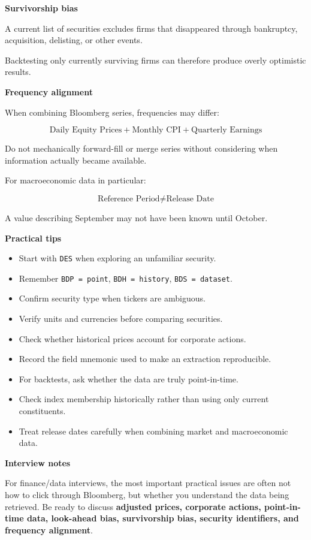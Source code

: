 \documentclass[11pt,letterpaper]{article}
\begin{document}
\textbf{Survivorship bias}

A current list of securities excludes firms that disappeared through
bankruptcy, acquisition, delisting, or other events.

Backtesting only currently surviving firms can therefore produce overly
optimistic results.

\textbf{Frequency alignment}

When combining Bloomberg series, frequencies may differ:

\[
\text{Daily Equity Prices}
+
\text{Monthly CPI}
+
\text{Quarterly Earnings}
\]

Do not mechanically forward-fill or merge series without considering when
information actually became available.

For macroeconomic data in particular:

\[
\text{Reference Period}
\neq
\text{Release Date}
\]

A value describing September may not have been known until October.

\textbf{Practical tips}

\begin{itemize}[leftmargin=*]
    \item Start with \texttt{DES} when exploring an unfamiliar security.
    \item Remember \texttt{BDP = point}, \texttt{BDH = history},
    \texttt{BDS = dataset}.
    \item Confirm security type when tickers are ambiguous.
    \item Verify units and currencies before comparing securities.
    \item Check whether historical prices account for corporate actions.
    \item Record the field mnemonic used to make an extraction reproducible.
    \item For backtests, ask whether the data are truly point-in-time.
    \item Check index membership historically rather than using only current
    constituents.
    \item Treat release dates carefully when combining market and macroeconomic data.
\end{itemize}

\textbf{Interview notes}

For finance/data interviews, the most important practical issues are often not
how to click through Bloomberg, but whether you understand the data being
retrieved. Be ready to discuss \textbf{adjusted prices, corporate actions,
point-in-time data, look-ahead bias, survivorship bias, security identifiers,
and frequency alignment}.
\end{document}
